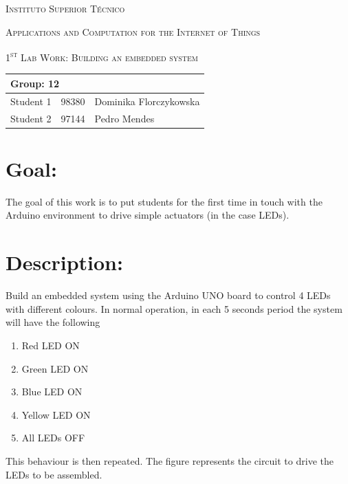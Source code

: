 \documentclass[10pt]{article}
\begin{document}
\begin{center}
    {\scshape Instituto Superior Técnico\par}
    \vspace{1cm}
    {\scshape\Large Applications and Computation for the Internet of Things\par}
    \vspace{1.5cm}
\end{center}
{\scshape\LARGE 1\textsuperscript{st} Lab Work: Building an embedded system}
\\
\begin{table}[h!]
    \centering
    \begin{tabular}{|l|l|p{10cm}|}
        \hline
        \multicolumn{3}{|l|}{Group: 12} \\[1.5ex] \hline
        Student 1 & 98380 & Dominika Florczykowska \\ [1.5ex]\hline
        Student 2 & 97144 & Pedro Mendes \\ [1.5ex]\hline
    \end{tabular}
\end{table}

\section{Goal:}
The goal of this work is to put students for the first time in touch with the
Arduino environment to drive simple actuators (in the case LEDs).
\section{Description:}
Build an embedded system using the Arduino UNO board to control 4 LEDs with
different colours. In normal operation, in each 5 seconds period the system will
have the following

\begin{enumerate}
    \item Red LED ON
    \item Green LED ON
    \item Blue LED ON
    \item Yellow LED ON
    \item All LEDs OFF
\end{enumerate}

This behaviour is then repeated.
\newpage
The figure represents the circuit to drive the LEDs to be assembled.
\end{document}

